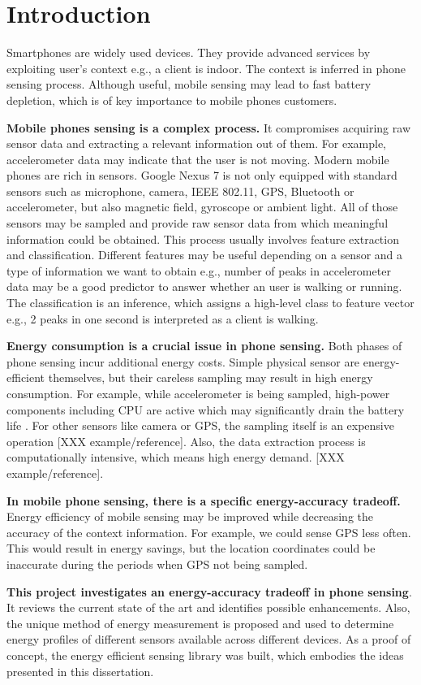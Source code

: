 \section{Introduction}
\label{s:intro}
\hspace{10pt} Smartphones are widely used devices. They provide advanced services by exploiting user's context e.g., a client is indoor. The context is inferred in phone sensing process. Although useful, mobile sensing may lead to fast battery depletion, which is of key importance to mobile phones customers. 

\textbf{Mobile phones sensing is a complex process.} It compromises acquiring raw sensor data and extracting a relevant information out of them. For example, accelerometer data may indicate that the user is not moving. Modern mobile phones are rich in sensors. Google Nexus 7 is not only equipped with standard sensors such as microphone, camera, IEEE 802.11, GPS, Bluetooth or accelerometer, but also magnetic field, gyroscope or ambient light. All of those sensors may be sampled and provide raw sensor data from which meaningful information could be obtained. This process usually involves feature extraction and classification. Different features may be useful depending on a sensor and a type of information we want to obtain e.g., number of peaks in accelerometer data may be a good predictor to answer whether an user is walking or running. The classification is an inference, which assigns a high-level class to feature vector e.g., 2 peaks in one second is interpreted as a client is walking.

\textbf{Energy consumption is a crucial issue in phone sensing.} Both phases of phone sensing incur additional energy costs. Simple physical sensor are energy-efficient themselves, but their careless sampling may result in high energy consumption. For example, while accelerometer is being sampled, high-power components including CPU are active which may significantly drain the battery life \cite{priyantha:littlerock}. For other sensors like camera or GPS, the sampling itself is an expensive operation [XXX example/reference]. Also, the data extraction process is computationally intensive, which means high energy demand. [XXX example/reference]. 

\textbf{In mobile phone sensing, there is a specific energy-accuracy tradeoff.} Energy efficiency of mobile sensing may be improved while decreasing the accuracy of the context information. For example, we could sense GPS less often. This would result in energy savings, but the location coordinates could be inaccurate during the periods when GPS not being sampled.

\textbf{This project investigates an energy-accuracy tradeoff in phone sensing}. It reviews the current state of the art and identifies possible enhancements. Also, the unique method of energy measurement is proposed and used to determine energy profiles of different sensors available across different devices. As a proof of concept, the energy efficient sensing library was built, which embodies the ideas presented in this dissertation.
